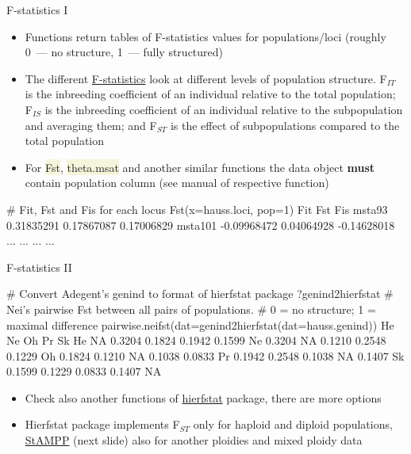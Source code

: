 \documentclass[compress, ucs, xelatex, 11pt, xcolor=svgnames, aspectratio=169,
	hyperref={
		bookmarks=true,
		unicode=true,
		colorlinks=true,
		pdftitle={Molecular data in R},
		plainpages=false,
		pdfauthor={Vojtech Zeisek},
		pdfsubject={Course about phylogeny and evolution in R},
		pdfcreator={XeLaTeX},
		pdfkeywords={R, evolution, phylogeny, molecular data},
		linkcolor=Crimson, %
		anchorcolor=Magenta, %
		citecolor=Magenta, %
		filecolor=Magenta, %
		menucolor=Magenta, %
		urlcolor=DodgerBlue, %
		pdftex},
	url={hyphens, lowtilde} %
	]{beamer}
\renewcommand{\texttt}[1]{\colorbox{Beige}{{\ttfamily #1}}}
\begin{document}
\begin{frame}[fragile]{F-statistics I}
	\begin{itemize}
		\item Functions return tables of F-statistics values for populations/loci (roughly 0~--- no structure, 1~--- fully structured)
		\item The different \href{https://en.wikipedia.org/wiki/F-statistics}{F-statistics} look at different levels of population structure. F$_{IT}$ is the inbreeding coefficient of an individual relative to the total population; F$_{IS}$ is the inbreeding coefficient of an individual relative to the subpopulation and averaging them; and F$_{ST}$ is the effect of subpopulations compared to the total population
		\item For \texttt{Fst}, \texttt{theta.msat} and another similar functions the data object \textbf{must} contain population column (see manual of respective function)
	\end{itemize}
	\begin{spluscode}
    # Fit, Fst and Fis for each locus
    Fst(x=hauss.loci, pop=1)
                    Fit        Fst         Fis
    msta93   0.31835291 0.17867087  0.17006829
    msta101 -0.09968472 0.04064928 -0.14628018
        ...         ...        ...         ...
	\end{spluscode}
\end{frame}

\begin{frame}[fragile]{F-statistics II}
	\begin{spluscode}
    # Convert Adegent's genind to format of hierfstat package
    ?genind2hierfstat
    # Nei's pairwise Fst between all pairs of populations.
    # 0 = no structure; 1 = maximal difference
    pairwise.neifst(dat=genind2hierfstat(dat=hauss.genind))
           He     Ne     Oh     Pr     Sk
    He     NA 0.3204 0.1824 0.1942 0.1599
    Ne 0.3204     NA 0.1210 0.2548 0.1229
    Oh 0.1824 0.1210     NA 0.1038 0.0833
    Pr 0.1942 0.2548 0.1038     NA 0.1407
    Sk 0.1599 0.1229 0.0833 0.1407     NA
	\end{spluscode}
	\begin{itemize}
		\item Check also another functions of \href{https://CRAN.R-project.org/package=hierfstat}{hierfstat} package, there are more options
		\item Hierfstat package implements F$_{ST}$ only for haploid and diploid populations, \href{https://CRAN.R-project.org/package=StAMPP}{StAMPP} (next slide) also for another ploidies and mixed ploidy data
	\end{itemize}
\end{frame}
\end{document}
